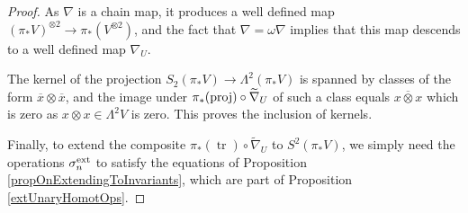 \documentclass[11pt]{amsart} \renewcommand{\baselinestretch}{1.2}
\theoremstyle{plain}
\numberwithin{equation}{section} %
\theoremstyle{plain}
\numberwithin{equation}{chapter} %
\DeclareMathOperator{\trace}{tr}
\newcommand{\DASH}{\mathrm{-}}
\renewcommand{\to}{\longrightarrow}
\newcommand{\calV}{\mathcal{V}}
\newcommand{\restn}[1]{#1^{[2]}}
\newcommand{\vect}[2]{\calV^{#1}_{#2}}
\newcommand{\twist}{\omega}
\newcommand{\Nabla}{\nabla}
\renewcommand{\mapsto}{\longmapsto}
\begin{document}
\begin{Constructing homotopy operations}
\begin{proof}
As $\nabla$ is a chain  map, it produces a well defined map $(\pi_*V)^{\otimes2}\to \pi_*(V^{\otimes2})$, and the fact that $\nabla=\twist\nabla$ implies that this map descends to a well defined map $\nabla_U$.

The kernel of the projection $S_2(\pi_*V)\to \Lambda^2(\pi_*V)$ is spanned by classes of the form $\overline{x}\otimes \overline{x}$, and the image under $\pi_*(\textup{proj})\circ\widetilde{\nabla}_U$ of such a class equals $\overline{x\otimes x}$ which is zero as $x\otimes x\in \Lambda^2V$ is zero. This proves the inclusion of kernels.

Finally, to extend the composite $\pi_*(\trace)\circ\widetilde{\nabla}_U$ to $S^2(\pi_*V)$, we simply need the operations $\sigma_n^\textup{ext}$ to satisfy the equations of Proposition \ref{propOnExtendingToInvariants}, which are part of Proposition \ref{extUnaryHomotOps}.
%
%
%
%
%
\end{proof}


\end{Constructing homotopy operations}
\end{document}
